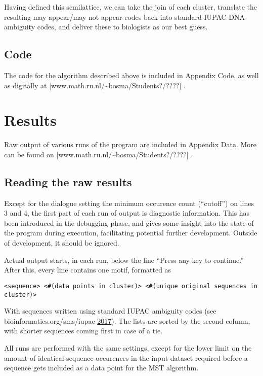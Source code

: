 \documentclass[fleqn]{book}
\begin{document}
Having defined this semilattice, we can take the join of each cluster,
translate the resulting may appear/may not appear-codes back into
standard IUPAC DNA ambiguity codes, and deliver these to biologists as
our best guess.

\section{Code}\label{code}

The code for the algorithm described above is included in Appendix Code,
as well as digitally at
{[}www.math.ru.nl/\textasciitilde{}bosma/Students?/????{]} .

\chapter{Results}\label{results}

Raw output of various runs of the program are included in Appendix Data.
More can be found on
{[}www.math.ru.nl/\textasciitilde{}bosma/Students?/????{]} .

\section{Reading the raw results}\label{reading-the-raw-results}

Except for the dialogue setting the minimum occurence count (``cutoff'')
on lines 3 and 4, the first part of each run of output is diagnostic
information. This has been introduced in the debugging phase, and gives
some insight into the state of the program during execution,
facilitating potential further development. Outside of development, it
should be ignored.

Actual output starts, in each run, below the line ``Press any key to
continue.'' After this, every line contains one motif, formatted as

\begin{verbatim}
<sequence> <#(data points in cluster)> <#(unique original sequences in cluster)>
\end{verbatim}

With sequences written using standard IUPAC ambiguity codes (see
bioinformatics.org/sms/iupac \protect\hyperlink{ref-iupacodes}{2017}).
The lists are sorted by the second column, with shorter sequences coming
first in case of a tie.

All runs are performed with the same settings, except for the lower
limit on the amount of identical sequence occurences in the input
dataset required before a sequence gets included as a data point for the
MST algorithm.
\end{document}
